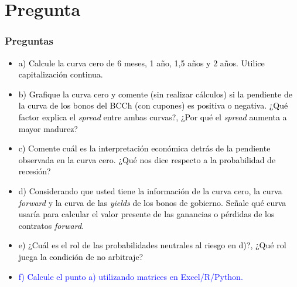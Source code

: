 \documentclass{beamer}
\begin{document}
\section{Pregunta }

\begin{frame}
  \frametitle{Preguntas}
  \begin{itemize}
    \scriptsize
    \item {\textcolor{black}{a) Calcule la curva cero de 6 meses, 1 año, 1,5 años y 2 años. Utilice capitalización continua.}}
    \vspace{3pt}
    \item {\textcolor{black}{b) Grafique la curva cero y comente (sin realizar cálculos) si la pendiente de la curva de los bonos del BCCh (con cupones) es positiva o negativa. ¿Qué factor explica el \textit{spread} entre ambas curvas?, ¿Por qué el \textit{spread} aumenta a mayor madurez?}}
    \vspace{3pt}
    \item {\textcolor{black}{c) Comente cuál es la interpretación económica detrás de la pendiente observada en la curva cero. ¿Qué nos dice respecto a la probabilidad de recesión?}}
    \vspace{3pt}
    \item {\textcolor{black}{d) Considerando que usted tiene la información de la curva cero, la curva \textit{forward} y la curva de las \textit{yields} de los bonos de gobierno. Señale qué curva usaría para calcular el valor presente de las ganancias o pérdidas de los contratos \textit{forward}.}}
    \vspace{3pt}
    \item {\textcolor{black}{e) ¿Cuál es el rol de las probabilidades neutrales al riesgo en d)?, ¿Qué rol juega la condición de no arbitraje?}}
    \vspace{3pt}
    \item {\Large\textcolor{blue}{f) Calcule el punto a) utilizando matrices en Excel/R/Python.}}
    \vspace{3pt}
  \end{itemize}
\end{frame}
\end{document}
